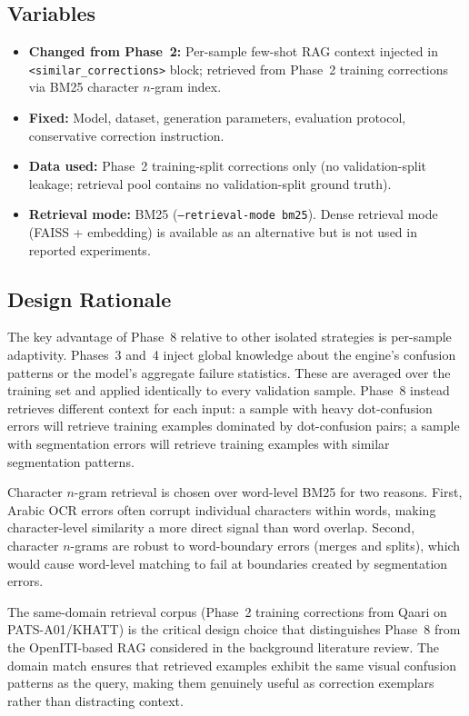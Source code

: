 \subsection{Variables}
\begin{itemize}
  \item \textbf{Changed from Phase~2:} Per-sample few-shot RAG context
        injected in \texttt{<similar\_corrections>} block; retrieved from
        Phase~2 training corrections via BM25 character $n$-gram index.
  \item \textbf{Fixed:} Model, dataset, generation parameters, evaluation
        protocol, conservative correction instruction.
  \item \textbf{Data used:} Phase~2 training-split corrections only
        (no validation-split leakage; retrieval pool contains no
        validation-split ground truth).
  \item \textbf{Retrieval mode:} BM25 (\texttt{--retrieval-mode bm25}).
        Dense retrieval mode (FAISS + embedding) is available as an
        alternative but is not used in reported experiments.
\end{itemize}

\subsection{Design Rationale}
\label{subsec:phase8_rationale}

The key advantage of Phase~8 relative to other isolated strategies is
per-sample adaptivity. Phases~3 and~4 inject global knowledge about the
engine's confusion patterns or the model's aggregate failure statistics.
These are averaged over the training set and applied identically to every
validation sample. Phase~8 instead retrieves different context for each
input: a sample with heavy dot-confusion errors will retrieve training
examples dominated by dot-confusion pairs; a sample with segmentation errors
will retrieve training examples with similar segmentation patterns.

Character $n$-gram retrieval is chosen over word-level BM25 for two reasons.
First, Arabic OCR errors often corrupt individual characters within words,
making character-level similarity a more direct signal than word overlap.
Second, character $n$-grams are robust to word-boundary errors (merges and
splits), which would cause word-level matching to fail at boundaries created
by segmentation errors.

The same-domain retrieval corpus (Phase~2 training corrections from Qaari on
PATS-A01/KHATT) is the critical design choice that distinguishes Phase~8 from
the OpenITI-based RAG considered in the background literature review. The
domain match ensures that retrieved examples exhibit the same visual confusion
patterns as the query, making them genuinely useful as correction exemplars
rather than distracting context.

